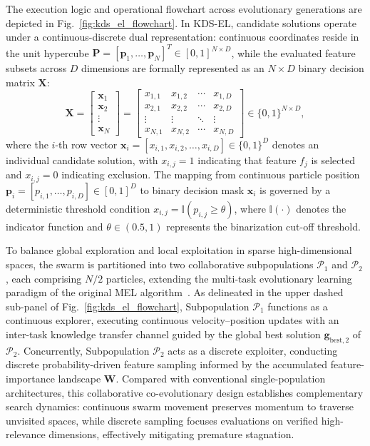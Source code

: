 The execution logic and operational flowchart across evolutionary generations are depicted in Fig.~\ref{fig:kds_el_flowchart}. In KDS-EL, candidate solutions operate under a continuous-discrete dual representation: continuous coordinates reside in the unit hypercube $\mathbf{P} = [\mathbf{p}_1, \dots, \mathbf{p}_N]^T \in [0, 1]^{N \times D}$, while the evaluated feature subsets across $D$ dimensions are formally represented as an $N \times D$ binary decision matrix $\mathbf{X}$:
\begin{equation}
\mathbf{X} = \begin{bmatrix}
\mathbf{x}_1 \\
\mathbf{x}_2 \\
\vdots \\
\mathbf{x}_N
\end{bmatrix} = \begin{bmatrix}
x_{1,1} & x_{1,2} & \cdots & x_{1,D} \\
x_{2,1} & x_{2,2} & \cdots & x_{2,D} \\
\vdots & \vdots & \ddots & \vdots \\
x_{N,1} & x_{N,2} & \cdots & x_{N,D}
\end{bmatrix} \in \{0, 1\}^{N \times D},
\label{eq:pop_matrix}
\end{equation}
where the $i$-th row vector $\mathbf{x}_i = [x_{i,1}, x_{i,2}, \dots, x_{i,D}] \in \{0, 1\}^D$ denotes an individual candidate solution, with $x_{i,j} = 1$ indicating that feature $f_j$ is selected and $x_{i,j} = 0$ indicating exclusion. The mapping from continuous particle position $\mathbf{p}_i = [p_{i,1}, \dots, p_{i,D}] \in [0, 1]^D$ to binary decision mask $\mathbf{x}_i$ is governed by a deterministic threshold condition $x_{i,j} = \mathbb{I}(p_{i,j} \ge \theta)$, where $\mathbb{I}(\cdot)$ denotes the indicator function and $\theta \in (0.5, 1)$ represents the binarization cut-off threshold.

To balance global exploration and local exploitation in sparse high-dimensional spaces, the swarm is partitioned into two collaborative subpopulations $\mathcal{P}_1$ and $\mathcal{P}_2$, each comprising $N/2$ particles, extending the multi-task evolutionary learning paradigm of the original MEL algorithm~\cite{mel2024}. As delineated in the upper dashed sub-panel of Fig.~\ref{fig:kds_el_flowchart}, Subpopulation $\mathcal{P}_1$ functions as a continuous explorer, executing continuous velocity--position updates with an inter-task knowledge transfer channel guided by the global best solution $\mathbf{g}_{\mathrm{best},2}$ of $\mathcal{P}_2$. Concurrently, Subpopulation $\mathcal{P}_2$ acts as a discrete exploiter, conducting discrete probability-driven feature sampling informed by the accumulated feature-importance landscape $\mathbf{W}$. Compared with conventional single-population architectures, this collaborative co-evolutionary design establishes complementary search dynamics: continuous swarm movement preserves momentum to traverse unvisited spaces, while discrete sampling focuses evaluations on verified high-relevance dimensions, effectively mitigating premature stagnation.


